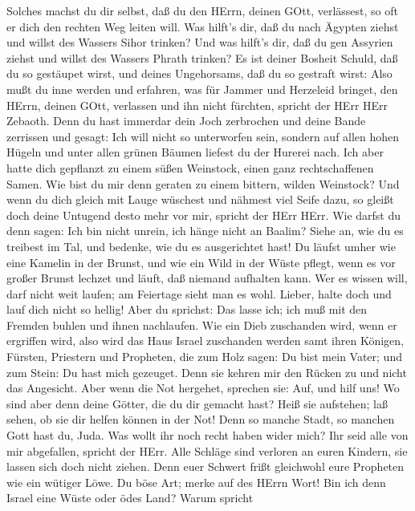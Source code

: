 Solches machst du dir selbst, daß du den HErrn, deinen GOtt, verlässest,
so oft er dich den rechten Weg leiten will.  Was hilft's
dir, daß du nach Ägypten ziehst und willst des Wassers Sihor trinken?
Und was hilft's dir, daß du gen Assyrien ziehst und willst des Wassers
Phrath trinken?  Es ist deiner Bosheit Schuld, daß du so
gestäupet wirst, und deines Ungehorsams, daß du so gestraft wirst: Also
mußt du inne werden und erfahren, was für Jammer und Herzeleid bringet,
den HErrn, deinen GOtt, verlassen und ihn nicht fürchten, spricht der
HErr HErr Zebaoth.  Denn du hast immerdar dein Joch
zerbrochen und deine Bande zerrissen und gesagt: Ich will nicht so
unterworfen sein, sondern auf allen hohen Hügeln und unter allen grünen
Bäumen liefest du der Hurerei nach.  Ich aber hatte dich
gepflanzt zu einem süßen Weinstock, einen ganz rechtschaffenen Samen.
Wie bist du mir denn geraten zu einem bittern, wilden Weinstock?
 Und wenn du dich gleich mit Lauge wüschest und nähmest
viel Seife dazu, so gleißt doch deine Untugend desto mehr vor mir,
spricht der HErr HErr.  Wie darfst du denn sagen: Ich bin
nicht unrein, ich hänge nicht an Baalim? Siehe an, wie du es treibest im
Tal, und bedenke, wie du es ausgerichtet hast!  Du läufst
umher wie eine Kamelin in der Brunst, und wie ein Wild in der Wüste
pflegt, wenn es vor großer Brunst lechzet und läuft, daß niemand
aufhalten kann. Wer es wissen will, darf nicht weit laufen; am Feiertage
sieht man es wohl.  Lieber, halte doch und lauf dich nicht
so hellig! Aber du sprichst: Das lasse ich; ich muß mit den Fremden
buhlen und ihnen nachlaufen.  Wie ein Dieb zuschanden wird,
wenn er ergriffen wird, also wird das Haus Israel zuschanden werden samt
ihren Königen, Fürsten, Priestern und Propheten,  die zum
Holz sagen: Du bist mein Vater; und zum Stein: Du hast mich gezeuget.
Denn sie kehren mir den Rücken zu und nicht das Angesicht. Aber wenn die
Not hergehet, sprechen sie: Auf, und hilf uns!  Wo sind
aber denn deine Götter, die du dir gemacht hast? Heiß sie aufstehen; laß
sehen, ob sie dir helfen können in der Not! Denn so manche Stadt, so
manchen Gott hast du, Juda.  Was wollt ihr noch recht haben
wider mich? Ihr seid alle von mir abgefallen, spricht der HErr.
 Alle Schläge sind verloren an euren Kindern, sie lassen
sich doch nicht ziehen. Denn euer Schwert frißt gleichwohl eure
Propheten wie ein wütiger Löwe.  Du böse Art; merke auf des
HErrn Wort! Bin ich denn Israel eine Wüste oder ödes Land? Warum spricht
